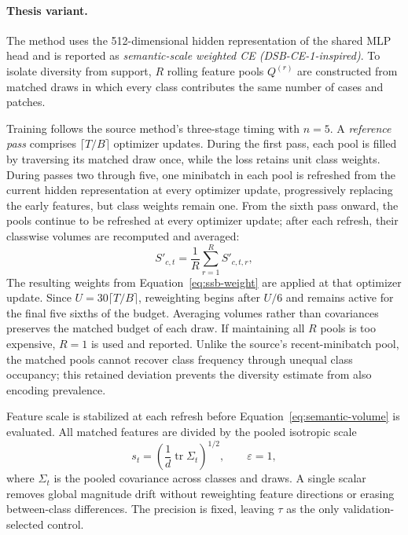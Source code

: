 \documentclass[11pt]{article}
\begin{document}
\paragraph{Thesis variant.}
The method uses the \num{512}-dimensional hidden representation of the shared MLP head and is reported as \emph{semantic-scale weighted CE (DSB-CE-1-inspired)}. To isolate diversity from support, $R$ rolling feature pools $Q^{(r)}$ are constructed from matched draws in which every class contributes the same number of cases and patches.

Training follows the source method's three-stage timing with $n=5$. A \emph{reference pass} comprises $\lceil T/B\rceil$ optimizer updates. During the first pass, each pool is filled by traversing its matched draw once, while the loss retains unit class weights. During passes two through five, one minibatch in each pool is refreshed from the current hidden representation at every optimizer update, progressively replacing the early features, but class weights remain one. From the sixth pass onward, the pools continue to be refreshed at every optimizer update; after each refresh, their classwise volumes are recomputed and averaged:
\begin{equation}
  S'_{c,t}=\frac{1}{R}\sum_{r=1}^{R}S'_{c,t,r},
  \label{eq:semantic-volume-avg}
\end{equation}
\noindent The resulting weights from Equation~\eqref{eq:ssb-weight} are applied at that optimizer update. Since $U=30\lceil T/B\rceil$, reweighting begins after $U/6$ and remains active for the final five sixths of the budget. Averaging volumes rather than covariances preserves the matched budget of each draw. If maintaining all $R$ pools is too expensive, $R=1$ is used and reported. Unlike the source's recent-minibatch pool, the matched pools cannot recover class frequency through unequal class occupancy; this retained deviation prevents the diversity estimate from also encoding prevalence.

Feature scale is stabilized at each refresh before Equation~\eqref{eq:semantic-volume} is evaluated. All matched features are divided by the pooled isotropic scale
\begin{equation}
  s_t=\left(\frac{1}{d}\operatorname{tr}\Sigma_t\right)^{1/2},
  \qquad \varepsilon=1,
  \label{eq:semantic-feature-scale}
\end{equation}
\noindent where $\Sigma_t$ is the pooled covariance across classes and draws. A single scalar removes global magnitude drift without reweighting feature directions or erasing between-class differences. The precision is fixed, leaving $\tau$ as the only validation-selected control.
\end{document}
